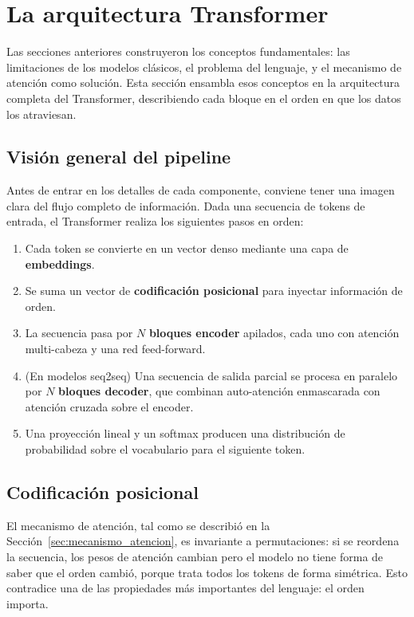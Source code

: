 \section{La arquitectura Transformer}
\label{sec:arquitectura_transformer}

Las secciones anteriores construyeron los conceptos fundamentales: las
limitaciones de los modelos clásicos, el problema del lenguaje, y el
mecanismo de atención como solución. Esta sección ensambla esos conceptos
en la arquitectura completa del Transformer, describiendo cada bloque en
el orden en que los datos los atraviesan.

\subsection{Visión general del pipeline}
\label{subsec:pipeline}

Antes de entrar en los detalles de cada componente, conviene tener una
imagen clara del flujo completo de información. Dada una secuencia de
tokens de entrada, el Transformer realiza los siguientes pasos en orden:

\begin{enumerate}
    \item Cada token se convierte en un vector denso mediante una capa de
    \textbf{embeddings}.
    \item Se suma un vector de \textbf{codificación posicional} para
    inyectar información de orden.
    \item La secuencia pasa por $N$ \textbf{bloques encoder} apilados,
    cada uno con atención multi-cabeza y una red feed-forward.
    \item (En modelos seq2seq) Una secuencia de salida parcial se procesa
    en paralelo por $N$ \textbf{bloques decoder}, que combinan
    auto-atención enmascarada con atención cruzada sobre el encoder.
    \item Una proyección lineal y un softmax producen una distribución
    de probabilidad sobre el vocabulario para el siguiente token.
\end{enumerate}

\subsection{Codificación posicional}
\label{subsec:positional_encoding}

El mecanismo de atención, tal como se describió en la
Sección~\ref{sec:mecanismo_atencion}, es invariante a permutaciones: si se
reordena la secuencia, los pesos de atención cambian pero el modelo no
tiene forma de saber que el orden cambió, porque trata todos los tokens
de forma simétrica. Esto contradice una de las propiedades más importantes
del lenguaje: el orden importa.

